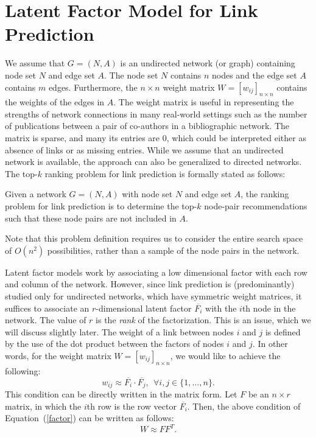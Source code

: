 \section{Latent Factor Model for Link Prediction}
\label{sec-NMF}

We assume that $G=(N, A)$ is an undirected network (or graph) containing node set $N$ and
edge set $A$. The node set $N$ contains $n$ nodes and the edge set
$A$ contains $m$ edges. Furthermore, the $n \times n$ weight matrix
$W= [w_{ij}]_{n\times n}$ contains the weights of the edges in $A$.
The weight matrix is useful in representing the strengths of network
connections in  many real-world settings such as the number of
publications between a pair of co-authors in a bibliographic
network.  The matrix is sparse, and many its entries are 0, which could be
interpreted either as absence of links or as missing entries. While
we assume that an undirected network is available, the approach can
also be generalized to directed networks.
%
 The top-$k$ ranking problem for link prediction is formally stated as follows:

\begin{definition}
Given a network $G=(N, A)$ with node set $N$ and edge set $A$, the ranking problem for link
prediction is to determine the top-$k$ node-pair recommendations such that these node pairs are not included in $A$.
\end{definition}
Note that this problem definition requires us to consider the entire
search space of $O(n^2)$ possibilities, rather than a sample of the
node pairs in the network.

Latent factor models work by associating a low dimensional factor
with each row and column of the network. However, since link
prediction is (predominantly) studied only for undirected networks,
which have symmetric weight matrices, it suffices to associate an
$r$-dimensional latent factor $\overline{F_i}$ with the $i$th node
in the network. The value of $r$ is the {\em rank} of the
factorization. This is an issue, which we will discuss slightly
later.  The weight of a link between nodes $i$ and $j$ is defined by
the use of the dot product between the factors of nodes $i$ and $j$.
In other words, for the weight matrix $W= [w_{ij}]_{n\times n}$, we
would like to achieve the following:
\begin{equation}
w_{ij} \approx \overline{F_i} \cdot \overline{F_j}, \ \ \forall i, j
\in \{ 1, \ldots, n \} \label{factor}.
\end{equation}
This condition can be directly written in the matrix form. Let $F$ be an
$n \times r$ matrix, in which the $i$th row is the row vector
$\overline{F_i}$. Then, the above condition of
Equation~(\ref{factor}) can be written as follows:
\begin{equation}
W \approx F F^T.
\end{equation}


